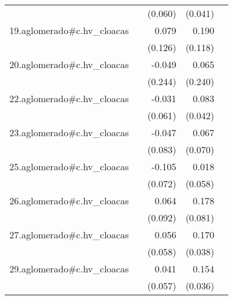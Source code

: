 {\begin{longtable}{l*{4}{D{.}{.}{-1}}}
            &                     &     (0.060)         &     (0.041)         &                     \\
\addlinespace
19.aglomerado#c.hv\_cloacas&                     &       0.079         &       0.190         &                     \\
            &                     &     (0.126)         &     (0.118)         &                     \\
\addlinespace
20.aglomerado#c.hv\_cloacas&                     &      -0.049         &       0.065         &                     \\
            &                     &     (0.244)         &     (0.240)         &                     \\
\addlinespace
22.aglomerado#c.hv\_cloacas&                     &      -0.031         &       0.083\sym{*}  &                     \\
            &                     &     (0.061)         &     (0.042)         &                     \\
\addlinespace
23.aglomerado#c.hv\_cloacas&                     &      -0.047         &       0.067         &                     \\
            &                     &     (0.083)         &     (0.070)         &                     \\
\addlinespace
25.aglomerado#c.hv\_cloacas&                     &      -0.105         &       0.018         &                     \\
            &                     &     (0.072)         &     (0.058)         &                     \\
\addlinespace
26.aglomerado#c.hv\_cloacas&                     &       0.064         &       0.178\sym{*}  &                     \\
            &                     &     (0.092)         &     (0.081)         &                     \\
\addlinespace
27.aglomerado#c.hv\_cloacas&                     &       0.056         &       0.170\sym{***}&                     \\
            &                     &     (0.058)         &     (0.038)         &                     \\
\addlinespace
29.aglomerado#c.hv\_cloacas&                     &       0.041         &       0.154\sym{***}&                     \\
            &                     &     (0.057)         &     (0.036)         &                     \\

\end{longtable}}
